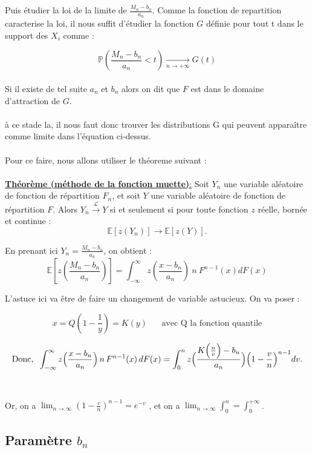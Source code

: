 \documentclass{article}
\begin{document}
Puis étudier la loi de la limite de $\frac{M_n - b_n}{a_n}$. Comme la fonction de repartition caracterise la loi, il nous suffit d'étudier la fonction $G$ définie pour tout t dans le support des $X_i$ comme :

\[
\mathbb{P} \left( \frac{M_n - b_n}{a_n} < t \right) \xrightarrow[n\to +\infty]{} G(t)
\]
\\
Si il existe de tel suite $a_n$ et $b_n$ alors on dit que $F$ est dans le domaine d'attraction de $G$.
\\
\\
à ce stade la, il nous faut donc trouver les distributions G qui peuvent apparaître comme limite dans l’équation ci-dessus.
\\
\\
Pour ce faire, nous allons utiliser le théoreme suivant : 
\\
\\
\underline{\textbf{Théorème (méthode de la fonction muette)}:}
Soit \( Y_n \) une variable aléatoire de fonction de répartition \( F_n \), et soit \( Y \) une variable aléatoire de fonction de répartition \( F \).  
Alors $Y_n \xrightarrow{\mathcal{L} } Y$ si et seulement si pour toute fonction $z$ réelle, bornée et continue :
\[
\mathbb{E}[z(Y_n)] \to \mathbb{E}[z(Y)].
\]

En prenant ici $Y_n = \frac{M_n -b_n}{a_n}$, on obtient :
\[
\mathbb{E}[z(\frac{M_n -b_n}{a_n})] = \int_{-\infty}^{\infty} z(\frac{x-b_n}{a_n}) \: n \:  F^{n-1} (x)dF(x)
\]

L'astuce ici va être de faire un changement de variable astucieux. On va poser : 

\[
x = Q(1-\frac{1}{y}) = K(y) \; \; \; \; \; \; \text{avec Q la fonction quantile}
\]

\begin{equation}\label{eq:1.1}
    \text{Donc,} \; \; \int_{-\infty}^{\infty} z\Bigl(\frac{x-b_n}{a_n}\Bigr) \, n \, F^{n-1}(x)\,dF(x)
    =\int_{0}^{n} z\Bigl(\frac{K\Bigl(\frac{n}{v}\Bigr)-b_n}{a_n}\Bigr)
    \Bigl(1-\frac{v}{n}\Bigr)^{n-1}dv.
\end{equation}
\\
\\
Or, on a $\lim_{n \to \infty} ( 1 - \frac{v}{n})^{n-1} = e^{-v}$ , et on a $\lim_{n \to \infty} \int_{0}^{n} = \int_{0}^{+ \infty}$.

\subsection{Paramètre $b_n$}
\end{document}
